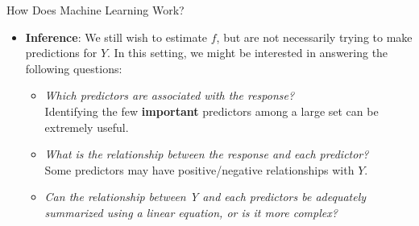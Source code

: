 \documentclass[aspectratio=169,xcolor=dvipsnames]{beamer}
\begin{document}
\begin{frame}{How Does Machine Learning Work?}
\begin{itemize}
\setlength{\itemsep}{.25cm}
	\item \textbf{Inference}: We still wish to estimate $f$, but are not necessarily trying to make predictions for $Y$. In this setting, we might be interested in answering the following questions:
	\begin{itemize}
	\setlength{\itemsep}{.2cm}
		\item \textit{Which predictors are associated with the response?} \\
		Identifying the few \textbf{important} predictors among a large set can be extremely useful.
		\item \textit{What is the relationship between the response and each predictor?} \\
		Some predictors may have positive/negative relationships with $Y$. 
		\item \textit{Can the relationship between Y and each predictors be adequately summarized using a linear equation, or is it more complex?}
	\end{itemize}

\end{itemize}
\end{frame}
\end{document}
